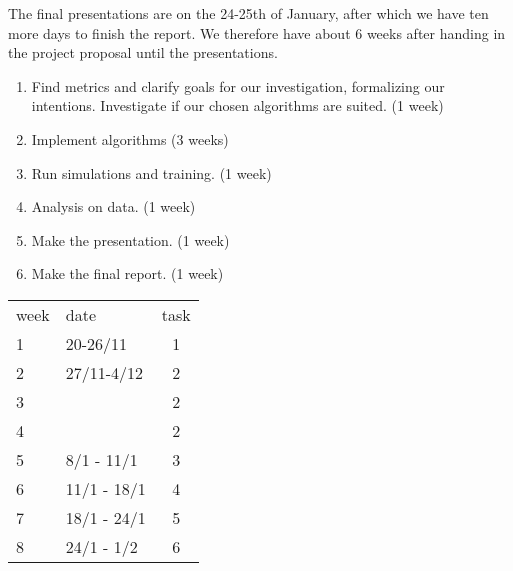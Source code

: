 The final presentations are on the 24-25th of January, after which we have ten
more days to finish the report. We therefore have about 6 weeks after handing in
the project proposal until the presentations.
\begin{enumerate}
    \item Find metrics and clarify goals for our investigation, formalizing
our intentions. Investigate if our chosen algorithms are suited. (1 week)
    \item Implement algorithms (3 weeks)
    \item Run simulations and training. (1 week)
    \item Analysis on data. (1 week)
    \item Make the presentation. (1 week)
    \item Make the final report. (1 week)
\end{enumerate}

\begin{tabular}{l | l | c }
week & date & task  \\
1 & 20-26/11 & 1 \\
2 & 27/11-4/12 & 2 \\
3 & & 2 \\ 
4 & & 2 \\ 
5 & 8/1 - 11/1 & 3 \\
6 & 11/1 - 18/1 & 4 \\
7 & 18/1 - 24/1 & 5 \\
8 & 24/1 - 1/2 & 6 \\

\end{tabular}


